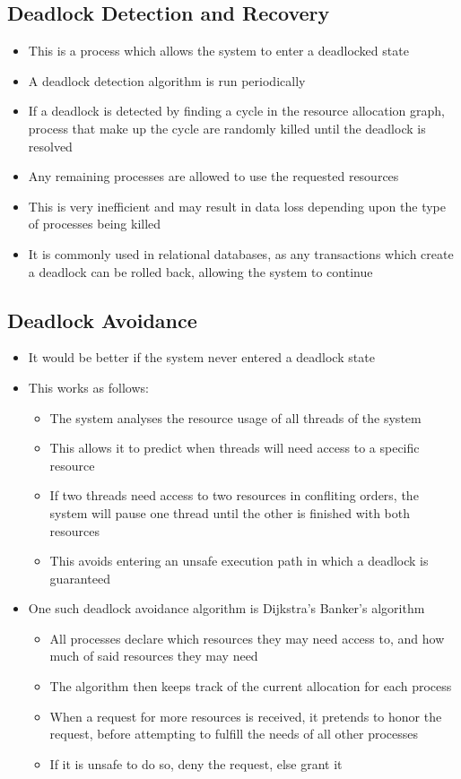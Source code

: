 \subsection*{Deadlock Detection and Recovery}

\begin{itemize}
  \item This is a process which allows the system to enter a deadlocked state
  \item A deadlock detection algorithm is run periodically
  \item If a deadlock is detected by finding a cycle in the resource allocation graph, process that make up the cycle are randomly killed until the deadlock is resolved
  \item Any remaining processes are allowed to use the requested resources
  \item This is very inefficient and may result in data loss depending upon the type of processes being killed
  \item It is commonly used in relational databases, as any transactions which create a deadlock can be rolled back, allowing the system to continue
\end{itemize}

\subsection*{Deadlock Avoidance}

\begin{itemize}
  \item It would be better if the system never entered a deadlock state
  \item This works as follows:
  \begin{itemize}
    \item The system analyses the resource usage of all threads of the system
    \item This allows it to predict when threads will need access to a specific resource
    \item If two threads need access to two resources in confliting orders, the system will pause one thread until the other is finished with both resources
    \item This avoids entering an unsafe execution path in which a deadlock is guaranteed
  \end{itemize}
  \item One such deadlock avoidance algorithm is Dijkstra's Banker's algorithm
  \begin{itemize}
    \item All processes declare which resources they may need access to, and how much of said resources they may need
    \item The algorithm then keeps track of the current allocation for each process
    \item When a request for more resources is received, it pretends to honor the request, before attempting to fulfill the needs of all other processes
    \item If it is unsafe to do so, deny the request, else grant it
  \end{itemize}
\end{itemize}